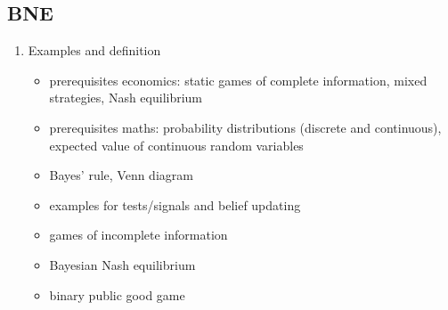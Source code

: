 \documentclass[11pt]{article}
\begin{document}
\subsection{BNE}
\label{sec:org06e4b7d}
\begin{enumerate}
\item Examples and definition
\label{sec:org12e6065}
\begin{itemize}
\item prerequisites economics: static games of complete information, mixed strategies, Nash equilibrium
\item prerequisites maths: probability distributions (discrete and continuous), expected value of continuous random variables
\item Bayes' rule, Venn diagram
\item examples for tests/signals and belief updating
\item games of incomplete information
\item Bayesian Nash equilibrium
\item binary public good game
\end{itemize}
\end{enumerate}
\end{document}
